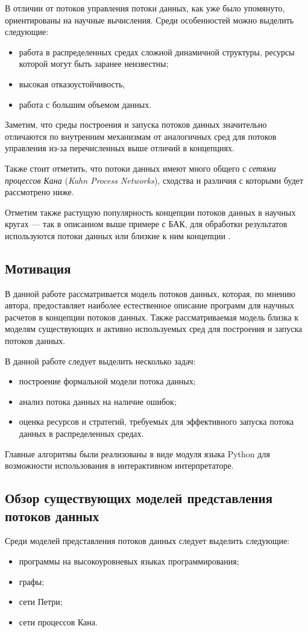 \documentclass[10pt,a4paper]{article}
\begin{document}
В отличии от потоков управления потоки данных, как уже было упомянуто, ориентированы на научные вычисления.
Среди особенностей можно выделить следующие:
\begin{itemize}
  \item работа в распределенных средах сложной динамичной структуры, ресурсы которой могут быть заранее неизвестны;
  \item высокая отказоустойчивость,
  \item работа с большим объемом данных.
\end{itemize}
Заметим, что среды построения и запуска потоков данных значительно отличаются по внутренним механизмам от
аналогичных сред для потоков управления из-за перечисленных выше отличий в концепциях.

Также стоит отметить, что потоки данных имеют
много общего с \textit{сетями процессов Кана} (\textit{Kahn Process Networks}), сходства и различия с которыми будет рассмотрено ниже.

Отметим также растущую популярность концепции потоков данных в научных кругах --- так в описанном выше примере с БАК,
для обработки результатов используются потоки данных или близкие к ним концепции \cite{lhc-manual}.

\subsection{Мотивация}
В данной работе рассматривается модель потоков данных, которая, по мнению автора, предоставляет наиболее
естественное описание программ для научных расчетов в концепции потоков данных.
Также рассматриваемая модель близка к моделям существующих и активно используемых сред для построения и запуска потоков данных.

В данной работе следует выделить несколько задач:
\begin{itemize}
  \item построение формальной модели потока данных;
  \item анализ потока данных на наличие ошибок;
  \item оценка ресурсов и стратегий, требуемых для эффективного запуска потока данных в распределенных средах.
\end{itemize}

Главные алгоритмы были реализованы в виде модуля языка Python для возможности
использования в интерактивном интерпретаторе.

\subsection{Обзор существующих моделей представления потоков данных}
Среди моделей представления потоков данных следует выделить следующие:
\begin{itemize}
  \item программы на высокоуровневых языках программирования;
  \item графы;
  \item сети Петри;
  \item сети процессов Кана.
\end{itemize}
\end{document}
